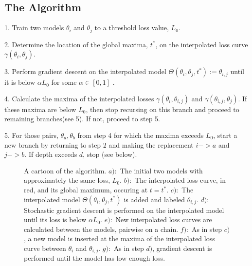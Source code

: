 \documentclass[twocolumn,superscriptaddress,aps,prb,floatfix]{revtex4-1}
\begin{document}
 \subsection{The Algorithm}
 \label{sec:Alg}
 
 1. Train two models $\theta_i$ and $\theta_j$ to a threshold loss value, $L_0$.
 
 2. Determine the location of the global maxima, $t^*$, on the interpolated loss curve $\gamma(\theta_i, \theta_j)$. 
 
 3. Perform gradient descent on the interpolated model $\Theta (\theta_i, \theta_j, t^*) := \theta_{i,j}$ until it is below $\alpha L_0$ for some $\alpha \in [0,1]$ .
 
 4. Calculate the maxima of the interpolated losses $\gamma(\theta_i, \theta_{i,j})$ and $\gamma(\theta_{i,j}, \theta_j)$.  If these maxima are below $L_0$, then stop recursing on this branch and proceed to remaining branches(see 5).  If not, proceed to step 5.
 
 5. For those pairs, $\theta_a, \theta_b$ from step 4 for which the maxima exceeds $L_0$, start a new branch by returning to step 2 and making the replacement $i->a$ and $j->b$.  If depth exceeds $d$, stop (see below).
 
 \begin{figure}
\begin{center}
\end{center}
\caption{A cartoon of the algorithm.  $a):$ The initial two models with approximately the same loss, $L_0$. $b):$ The interpolated loss curve, in red, and its global maximum, occuring at $t=t^*$. $c):$ The interpolated model $\Theta(\theta_i, \theta_j, t^*)$ is added and labeled $\theta_{i,j}$.  $d):$ Stochastic gradient descent is performed on the interpolated model until its loss is below $\alpha L_0$. $e):$ New interpolated loss curves are calculated between the models, pairwise on a chain.  $f):$ As in step $c)$, a new model is inserted at the maxima of the interpolated loss curve between $\theta_i$ and $\theta_{i,j}$.  $g):$  As in step $d)$, gradient descent is performed until the model has low enough loss.}
\label{fig:AlgorithmFigure}
\end{figure}
 
\end{document}
